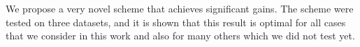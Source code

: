 We propose a very novel scheme that achieves significant gains. The scheme were tested on three datasets, and it is shown that this result is optimal for all cases that we consider in this work and also for many others which we did not test yet.
